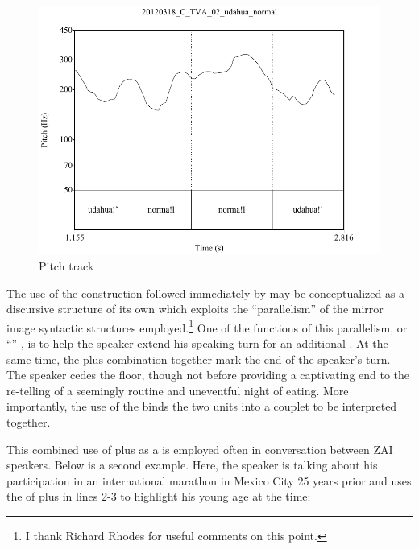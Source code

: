  \begin{figure} 
\caption{Pitch track}
\label{fig:5:gudahuanormal}
 
\includegraphics[height=.4\textheight]{gudahuanormal}
 \end{figure}


The use of the  construction followed immediately by  may be conceptualized as a discursive structure of its own which exploits the ``parallelism'' \citep{jakobson1966,fox1977} of the mirror image syntactic structures employed.\footnote{I thank Richard Rhodes for useful comments on this point.} One of the functions of this parallelism, or ``'' \citep{silverstein1984}, is to help the speaker extend his speaking turn for an additional . At the same time, the  plus  combination together mark the end of the speaker's turn. The speaker cedes the floor, though not before providing a captivating end to the re-telling of a seemingly routine and uneventful night of eating. More importantly, the use of the  binds the two  units into a couplet to be interpreted together.

This combined use of  plus  as a  is employed often in conversation between ZAI speakers. Below is a second example. Here, the speaker is talking about his participation in an international marathon in Mexico City 25 years prior and uses the  of  plus  in lines 2-3 to highlight his young age at the time:

